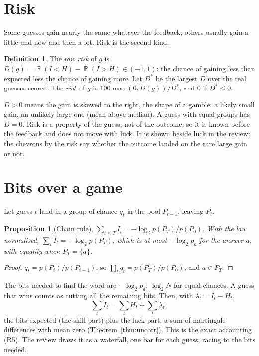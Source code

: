 \documentclass[11pt]{article}
\newtheorem{proposition}[theorem]{Proposition}
\theoremstyle{definition}
\newtheorem{definition}{Definition}
\theoremstyle{remark}
\DeclareMathOperator{\Prob}{\mathbb{P}}
\newcommand{\Gain}{I}
\begin{document}
\section{Risk}\label{sec:risk}

Some guesses gain nearly the same whatever the feedback; others usually gain a little
and now and then a lot. Risk is the second kind.

\begin{definition}
The \emph{raw risk} of $g$ is
$D(g)=\Prob(\Gain<H)-\Prob(\Gain>H)\in(-1,1)$: the chance of gaining less than
expected less the chance of gaining more. Let $D^*$ be the largest $D$ over the real
guesses scored. The \emph{risk} of $g$ is $100\max(0,D(g))/D^*$, and $0$ if
$D^*\le0$.
\end{definition}

$D>0$ means the gain is skewed to the right, the shape of a gamble: a likely small
gain, an unlikely large one (mean above median). A guess with equal groups has
$D=0$. Risk is a property of the guess, not of the outcome, so it is known before the
feedback and does not move with luck. It is shown beside luck in the review: the
chevrons by the risk say whether the outcome landed on the rare large gain or not.

\section{Bits over a game}\label{sec:bits}

Let guess $t$ land in a group of chance $q_t$ in the pool $P_{t-1}$, leaving
$P_t$.

\begin{proposition}[Chain rule]\label{prop:chain}
$\sum_{t\le T}\Gain_t=-\log_2 p(P_T)/p(P_0)$. With the law normalised,
$\sum_t\Gain_t=-\log_2 p(P_T)$, which is at most $-\log_2 p_a$ for the answer $a$,
with equality when $P_T=\{a\}$.
\end{proposition}
\begin{proof}
$q_t=p(P_t)/p(P_{t-1})$, so $\prod_t q_t=p(P_T)/p(P_0)$, and $a\in P_T$.
\end{proof}

The bits needed to find the word are $-\log_2 p_a$: $\log_2 N$ for equal chances.
A guess that wins counts as cutting all the remaining bits. Then, with
$\lambda_t=\Gain_t-H_t$,
\[
\sum_t\Gain_t=\sum_t H_t+\sum_t\lambda_t ,
\]
the bits expected (the skill part) plus the luck part, a sum of martingale
differences with mean zero (Theorem~\ref{thm:uncorr}). This is the exact accounting
(R5). The review draws it as a waterfall, one bar for each guess, racing to the
bits needed.
\end{document}
